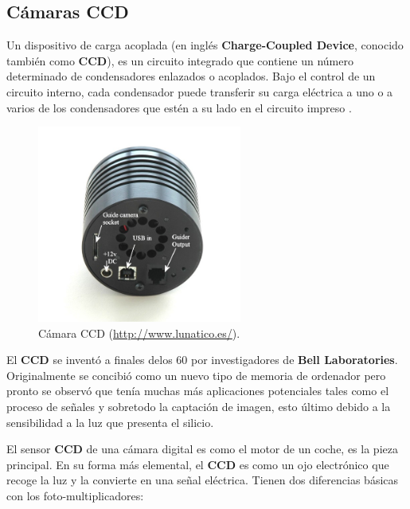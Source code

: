 \subsection{Cámaras CCD}

Un dispositivo de carga acoplada (en inglés \textbf{Charge-Coupled Device}, conocido también como \textbf{CCD}), es un circuito integrado que contiene un número determinado de condensadores enlazados o acoplados. Bajo el control de un circuito interno, cada condensador puede transferir su carga eléctrica a uno o a varios de los condensadores que estén a su lado en el circuito impreso \cite{CCD}.

\bigskip
\begin{figure}[!ht]
  \begin{center}
  \includegraphics[width=0.6\textwidth]{../images/ccd.jpg}
  \caption[Cámara CCD]{Cámara CCD (\href{http://www.lunatico.es/}{http://www.lunatico.es/}).}
  \label{fig:diag_scrum}
  \end{center}
\end{figure}

\bigskip
El \textbf{CCD} se inventó a finales delos 60 por investigadores de \textbf{Bell Laboratories}. Originalmente se concibió como un nuevo tipo de memoria de ordenador pero pronto se observó que tenía muchas más aplicaciones potenciales tales como el proceso de señales y sobretodo la captación de imagen, esto último debido a la sensibilidad a la luz que presenta el silicio.

\bigskip
El sensor \textbf{CCD} de una cámara digital es como el motor de un coche, es la pieza principal. En su forma más elemental, el \textbf{CCD} es como un ojo electrónico que recoge la luz y la convierte en una señal eléctrica. Tienen dos diferencias básicas con los foto-multiplicadores:

